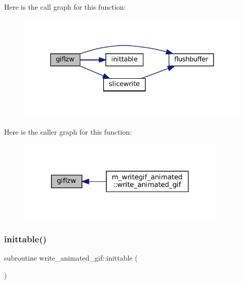 Here is the call graph for this function\+:
\nopagebreak
\begin{figure}[H]
\begin{center}
\leavevmode
\includegraphics[width=329pt]{M__writegif__animated_8f90_aa30b256c6cb90f13a18e32768d35696b_cgraph}
\end{center}
\end{figure}
Here is the caller graph for this function\+:
\nopagebreak
\begin{figure}[H]
\begin{center}
\leavevmode
\includegraphics[width=282pt]{M__writegif__animated_8f90_aa30b256c6cb90f13a18e32768d35696b_icgraph}
\end{center}
\end{figure}
\mbox{\label{M__writegif__animated_8f90_acd7274fbac8690a12be91b542378a4eb}} 
\subsubsection{\texorpdfstring{inittable()}{inittable()}}
{\footnotesize\ttfamily subroutine write\+\_\+animated\+\_\+gif\+::inittable (\begin{DoxyParamCaption}{ }\end{DoxyParamCaption})\hspace{0.3cm}{\ttfamily [private]}}

